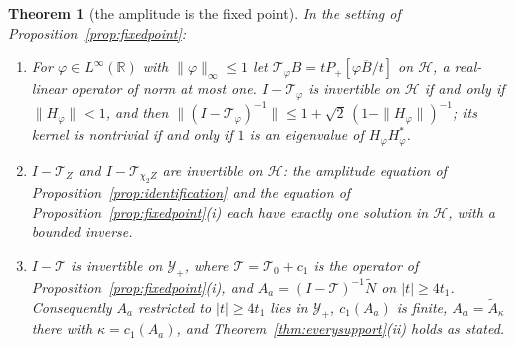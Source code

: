 \documentclass[11pt]{article}
\newtheorem{theorem}{Theorem}[section]
\theoremstyle{definition}
\theoremstyle{remark}
\newcommand{\R}{\mathbb{R}}
\begin{document}
\begin{theorem}[the amplitude is the fixed point]\label{thm:identification}
In the setting of Proposition~\ref{prop:fixedpoint}:
\begin{enumerate}
\item[(i)] For $\varphi\in L^\infty(\R)$ with $\|\varphi\|_\infty\le1$ let $\mathcal T_\varphi B=tP_+[\varphi\overline B/t]$ on $\mathcal H$, a real-linear operator of norm at most one. $I-\mathcal T_\varphi$ is invertible on $\mathcal H$ if and only if $\|H_\varphi\|<1$, and then $\|(I-\mathcal T_\varphi)^{-1}\|\le1+\sqrt2\,(1-\|H_\varphi\|)^{-1}$; its kernel is nontrivial if and only if $1$ is an eigenvalue of $H_\varphi H_\varphi^*$.
\item[(ii)] $I-\mathcal T_Z$ and $I-\mathcal T_{\chi_2Z}$ are invertible on $\mathcal H$: the amplitude equation of Proposition~\ref{prop:identification} and the equation of Proposition~\ref{prop:fixedpoint}(i) each have exactly one solution in $\mathcal H$, with a bounded inverse.
\item[(iii)] $I-\mathcal T$ is invertible on $\mathcal Y_+$, where $\mathcal T=\mathcal T_0+c_1$ is the operator of Proposition~\ref{prop:fixedpoint}(i), and $A_a=(I-\mathcal T)^{-1}\tilde N$ on $|t|\ge4t_1$. Consequently $A_a$ restricted to $|t|\ge4t_1$ lies in $\mathcal Y_+$, $c_1(A_a)$ is finite, $A_a=\tilde A_\kappa$ there with $\kappa=c_1(A_a)$, and Theorem~\ref{thm:everysupport}(ii) holds as stated.
\end{enumerate}
\end{theorem}
\end{document}

